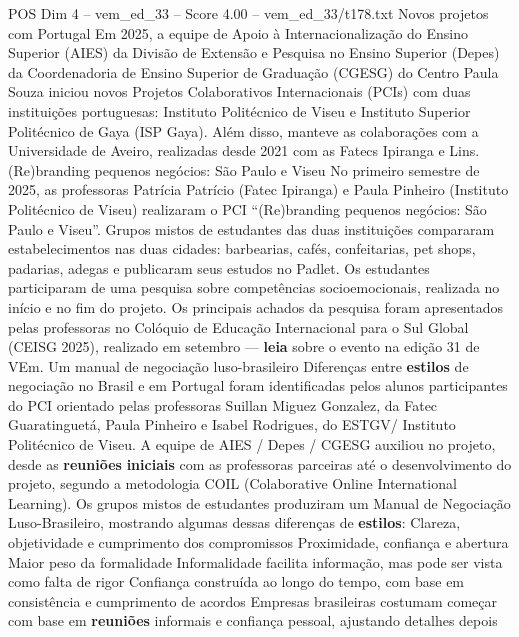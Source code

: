 \begin{textsample}{POS Dim 4 – vem\_ed\_33 – Score 4.00 – vem\_ed\_33/t178.txt}  \label{ex:f4_pos_126}
Novos projetos com Portugal Em 2025, a equipe de Apoio à Internacionalização do Ensino Superior (AIES) da Divisão de Extensão e Pesquisa no Ensino Superior (Depes) da Coordenadoria de Ensino Superior de Graduação (CGESG) do Centro Paula Souza iniciou novos Projetos Colaborativos Internacionais (PCIs) com duas instituições portuguesas: Instituto Politécnico de Viseu e Instituto Superior Politécnico de Gaya (ISP Gaya).
Além disso, manteve as colaborações com a Universidade de Aveiro, realizadas desde 2021 com as Fatecs Ipiranga e Lins. (Re)branding pequenos negócios: São Paulo e Viseu No primeiro semestre de 2025, as professoras Patrícia Patrício (Fatec Ipiranga) e Paula Pinheiro (Instituto Politécnico de Viseu) realizaram o PCI “(Re)branding pequenos negócios: São Paulo e Viseu”.
Grupos mistos de estudantes das duas instituições compararam estabelecimentos nas duas cidades: barbearias, cafés, confeitarias, pet shops, padarias, adegas e publicaram seus estudos no Padlet.
Os estudantes participaram de uma pesquisa sobre competências socioemocionais, realizada no início e no fim do projeto.
Os principais achados da pesquisa foram apresentados pelas professoras no Colóquio de Educação Internacional para o Sul Global (CEISG 2025), realizado em setembro — \textbf{leia} sobre o evento na edição 31 de VEm.
Um manual de negociação luso-brasileiro Diferenças entre \textbf{estilos} de negociação no Brasil e em Portugal foram identificadas pelos alunos participantes do PCI orientado pelas professoras Suillan Miguez Gonzalez, da Fatec Guaratinguetá, Paula Pinheiro e Isabel Rodrigues, do ESTGV/ Instituto Politécnico de Viseu.
A equipe de AIES / Depes / CGESG auxiliou no projeto, desde as \textbf{reuniões} \textbf{iniciais} com as professoras parceiras até o desenvolvimento do projeto, segundo a metodologia COIL (Colaborative Online International Learning).
Os grupos mistos de estudantes produziram um Manual de Negociação Luso-Brasileiro, mostrando algumas dessas diferenças de \textbf{estilos}: Clareza, objetividade e cumprimento dos compromissos Proximidade, confiança e abertura Maior peso da formalidade Informalidade facilita informação, mas pode ser vista como falta de rigor Confiança construída ao longo do tempo, com base em consistência e cumprimento de acordos Empresas brasileiras costumam começar com base em \textbf{reuniões} informais e confiança pessoal, ajustando detalhes depois

\end{textsample}

